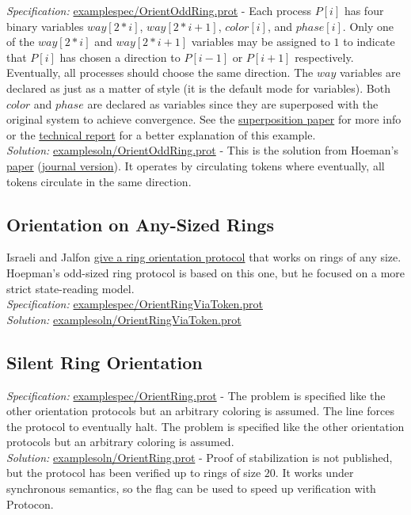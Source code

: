 \textit{Specification:} \url{examplespec/OrientOddRing.prot}
- Each process $P[i]$ has four binary variables $way[2*i]$, $way[2*i+1]$, $color[i]$, and $phase[i]$.
Only one of the $way[2*i]$ and $way[2*i+1]$ variables may be assigned to $1$ to indicate that $P[i]$ has chosen a direction to $P[i-1]$ or $P[i+1]$ respectively.
Eventually, all processes should choose the same direction.
The $way$ variables are declared as  just as a matter of style (it is the default mode for variables).
Both $color$ and $phase$ are declared as  variables since they are superposed with the original system to achieve convergence.
See the \href{http://dx.doi.org/10.1007/978-3-319-11764-5_18}{superposition paper} for more info or the \href{http://www.mtu.edu/cs/research/papers/pdfs/CS-TR-14-01.pdf}{technical report} for a better explanation of this example.
\\\textit{Solution:} \url{examplesoln/OrientOddRing.prot}
- This is the solution from Hoeman's \href{http://dx.doi.org/10.1007/BFb0020439}{paper} (\href{http://dx.doi.org/10.1006/inco.1998.2707}{journal version}).
It operates by circulating tokens where eventually, all tokens circulate in the same direction.

\subsection{Orientation on Any-Sized Rings}

Israeli and Jalfon \href{http://dx.doi.org/10.1006/inco.1993.1029}{give a ring orientation protocol} that works on rings of any size.
Hoepman's odd-sized ring protocol is based on this one, but he focused on a more strict state-reading model.
\\\textit{Specification:} \url{examplespec/OrientRingViaToken.prot}
\\\textit{Solution:} \url{examplesoln/OrientRingViaToken.prot}

\subsection{Silent Ring Orientation}

\textit{Specification:} \url{examplespec/OrientRing.prot}
- The problem is specified like the other orientation protocols but an arbitrary coloring is assumed.
The line  forces the protocol to eventually halt.
The problem is specified like the other orientation protocols but an arbitrary coloring is assumed.
\\\textit{Solution:} \url{examplesoln/OrientRing.prot}
- Proof of stabilization is not published, but the protocol has been verified up to rings of size $20$.
It works under synchronous semantics, so the  flag can be used to speed up verification with Protocon.

